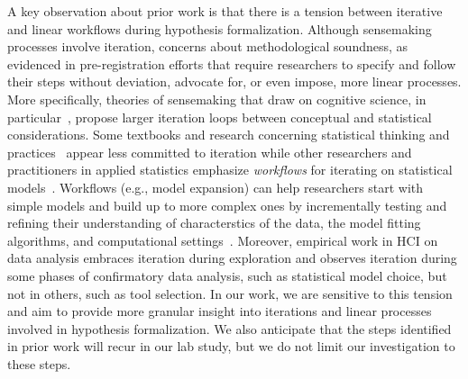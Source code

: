 A key observation about prior work is that there is a tension between iterative
and linear workflows during hypothesis formalization. Although sensemaking
processes involve iteration, concerns about methodological soundness, as
evidenced in pre-registration efforts that require researchers to specify and
follow their steps without deviation, advocate for, or even impose, more linear
processes. More specifically, theories of sensemaking that draw on cognitive
science, in particular~\cite{russell1993cost,grolemund2014cognitive}, propose
larger iteration loops between conceptual and statistical considerations. Some
textbooks and research concerning statistical thinking and
practices~\cite{wild1999statisticalThinking,carver2016guidelines} appear less
committed to iteration while other researchers and practitioners in applied
statistics emphasize \textit{workflows} for iterating on statistical
models~\cite{yu2020veridical,lee2019robust,gelman2013bayesianTextbook}.
Workflows (e.g., model expansion) can help researchers start with simple models and build up to more
complex ones by incrementally testing and refining their
understanding of characterstics of the data, the model fitting algorithms, and
computational settings~\cite{betancourt2020bayesianWorkflow,gelman2020bayesianWorkflow,gabry2019visualization}. Moreover, empirical work in HCI on data analysis embraces
iteration during exploration and observes iteration during some phases of
confirmatory data analysis, such as statistical model choice, but not in others,
such as tool selection. In our work, we are sensitive to this tension and aim to
provide more granular insight into iterations and linear processes involved in
hypothesis formalization. We also anticipate that the steps identified in prior
work will recur in our lab study, but we do not limit our investigation to these
steps. 